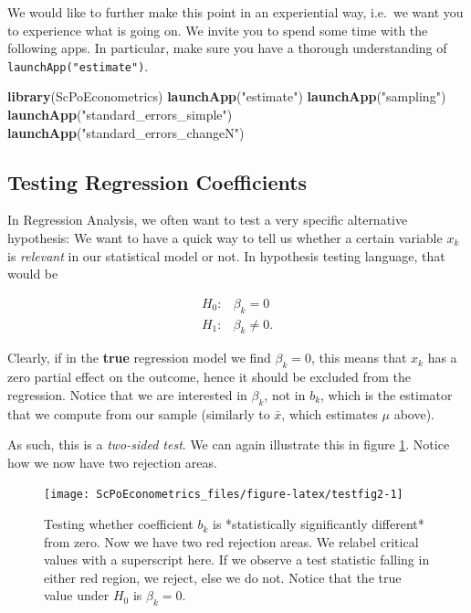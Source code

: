 \documentclass[]{book}
\newenvironment{Shaded}{\begin{snugshade}}{\end{snugshade}}
\newcommand{\KeywordTok}[1]{\textcolor[rgb]{0.13,0.29,0.53}{\textbf{#1}}}
\newcommand{\NormalTok}[1]{#1}
\newcommand{\StringTok}[1]{\textcolor[rgb]{0.31,0.60,0.02}{#1}}
\begin{document}
We would like to further make this point in an experiential way, i.e.~we want you to experience what is going on. We invite you to spend some time with the following apps. In particular, make sure you have a thorough understanding of \texttt{launchApp("estimate")}.

\begin{Shaded}
\begin{Highlighting}[]
\KeywordTok{library}\NormalTok{(ScPoEconometrics)}
\KeywordTok{launchApp}\NormalTok{(}\StringTok{"estimate"}\NormalTok{)}
\KeywordTok{launchApp}\NormalTok{(}\StringTok{"sampling"}\NormalTok{)  }
\KeywordTok{launchApp}\NormalTok{(}\StringTok{"standard_errors_simple"}\NormalTok{) }
\KeywordTok{launchApp}\NormalTok{(}\StringTok{"standard_errors_changeN"}\NormalTok{) }
\end{Highlighting}
\end{Shaded}

\hypertarget{testing-regression-coefficients}{%
\subsection{Testing Regression Coefficients}\label{testing-regression-coefficients}}

In Regression Analysis, we often want to test a very specific alternative hypothesis: We want to have a quick way to tell us whether a certain variable \(x_k\) is \emph{relevant} in our statistical model or not. In hypothesis testing language, that would be

\begin{align}
H_0:& \beta_k = 0\\
H_1:& \beta_k \neq 0.\label{eq:H0}
\end{align}

Clearly, if in the \textbf{true} regression model we find \(\beta_k=0\), this means that \(x_k\) has a zero partial effect on the outcome, hence it should be excluded from the regression. Notice that we are interested in \(\beta_k\), not in \(b_k\), which is the estimator that we compute from our sample (similarly to \(\bar{x}\), which estimates \(\mu\) above).

As such, this is a \emph{two-sided test}. We can again illustrate this in figure \ref{fig:testfig2}. Notice how we now have two rejection areas.

\begin{figure}

{\centering \texttt{[image: ScPoEconometrics\_files/figure-latex/testfig2-1]} 

}

\caption{Testing whether coefficient $b_k$ is *statistically significantly different* from zero. Now we have two red rejection areas. We relabel critical values with a superscript here. If we observe a test statistic falling in either red region, we reject, else we do not. Notice that the true value under $H_0$ is $\beta_k=0$. }\label{fig:testfig2}
\end{figure}
\end{document}
